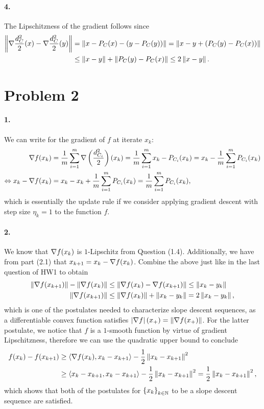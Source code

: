 \documentclass[10pt]{article}
\begin{document}
\paragraph{4.}
The Lipschitzness of the gradient follows since
\begin{align*}
    \left \| \nabla \frac{d_C^2}{2}(x) - \nabla \frac{d_C^2}{2}(y) \right \| &=
    \left \| x - P_C(x) - (y - P_C(y)) \right \| = \left \| x - y + (P_C(y) - P_C(x)) \right \| \\
    &\leq \left \| x - y \right \| + \left \| P_C(y) - P_C(x) \right \| \leq 2 \left \| x - y \right \|.
\end{align*}

\section*{Problem 2}
\paragraph{1.}
We can write for the gradient of $f$ at iterate $x_k$:
\begin{align*}
    \nabla f(x_k) &= \frac{1}{m} \sum_{i=1}^{m} \nabla \left(
    \frac{d^2_{C_i}}{2} \right)(x_k) = \frac{1}{m} \sum_{i=1}^m x_k -
    P_{C_i}(x_k) = x_k - \frac{1}{m} \sum_{i=1}^m P_{C_i}(x_k) \\
    \Leftrightarrow
    x_k - \nabla f(x_k) &= x_k - x_k + \frac{1}{m} \sum_{i=1}^m P_{C_i}(x_k)
        = \frac{1}{m} \sum_{i=1}^m P_{C_i}(x_k),
\end{align*}
which is essentially the update rule if we consider applying gradient descent
with step size $\eta_k = 1$ to the function $f$.

\paragraph{2.}
We know that $\nabla f(x_k)$ is $1$-Lipschitz from Question (1.4).
Additionally, we have from part (2.1) that $x_{k+1} = x_k - \nabla f(x_k)$.
Combine the above just like in the last question of HW1 to obtain
\begin{align*}
    \left \| \nabla f(x_{k+1}) \right \| - \left \| \nabla f(x_k) \right \| &\leq
    \left \| \nabla f(x_k) - \nabla f(x_{k+1}) \right \| \leq \left \| x_k - y_k \right \| \\
    \left \| \nabla f(x_{k+1}) \right \| &\leq \left \| \nabla f(x_k) \right \| + \left \| x_k - y_k \right \|
        = 2 \left \| x_k - y_k \right \|,
\end{align*}
which is one of the postulates needed to characterize slope descent sequences,
as a differentiable convex function satisfies $\left| \nabla f \right|(x_+) =
\left \| \nabla f(x_+) \right \|$. For the latter postulate, we notice that $f$ is a
$1$-smooth function by virtue of gradient Lipschitzness, therefore we can
use the quadratic upper bound to conclude
\begin{align*}
    f(x_k) - f(x_{k+1}) &\geq \left\langle \nabla f(x_{k}), x_k - x_{k+1} \right\rangle - \frac{1}{2}
    \left \| x_k - x_{k+1} \right \|^2 \\
    &\geq \left\langle x_k - x_{k+1}, x_k - x_{k+1} \right\rangle - \frac{1}{2} \left \| x_k - x_{k+1} \right \|^2
    = \frac{1}{2} \left \| x_k - x_{k+1} \right \|^2,
\end{align*}
which shows that both of the postulates for $\left\{ x_k \right\}_{k \in \mathbb{N}}$ to be a
slope descent sequence are satisfied.
\end{document}
